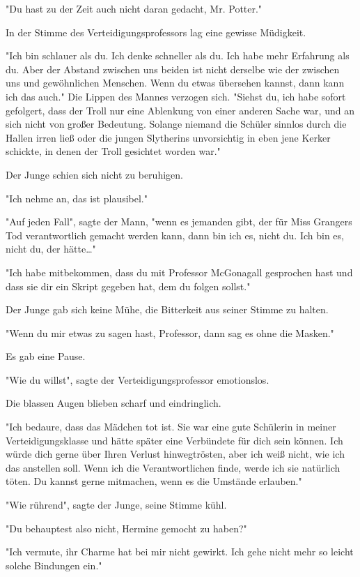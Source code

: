 {"Du hast zu der Zeit auch nicht daran gedacht, Mr. Potter."

In der Stimme des Verteidigungsprofessors lag eine gewisse Müdigkeit.

"Ich bin schlauer als du. Ich denke schneller als du. Ich habe mehr Erfahrung als du. Aber der Abstand zwischen uns beiden ist nicht derselbe wie der zwischen uns und gewöhnlichen Menschen. Wenn du etwas übersehen kannst, dann kann ich das auch." Die Lippen des Mannes verzogen sich. "Siehst du, ich habe sofort gefolgert, dass der Troll nur eine Ablenkung von einer anderen Sache war, und an sich nicht von großer Bedeutung. Solange niemand die Schüler sinnlos durch die Hallen irren ließ oder die jungen Slytherins unvorsichtig in eben jene Kerker schickte, in denen der Troll gesichtet worden war."

Der Junge schien sich nicht zu beruhigen.

"Ich nehme an, das ist plausibel."

"Auf jeden Fall", sagte der Mann, "wenn es jemanden gibt, der für Miss Grangers Tod verantwortlich gemacht werden kann, dann bin ich es, nicht du. Ich bin es, nicht du, der hätte…"

"Ich habe mitbekommen, dass du mit Professor McGonagall gesprochen hast und dass sie dir ein Skript gegeben hat, dem du folgen sollst."

Der Junge gab sich keine Mühe, die Bitterkeit aus seiner Stimme zu halten.

"Wenn du mir etwas zu sagen hast, Professor, dann sag es ohne die Masken."

Es gab eine Pause.

"Wie du willst", sagte der Verteidigungsprofessor emotionslos.

Die blassen Augen blieben scharf und eindringlich.

"Ich bedaure, dass das Mädchen tot ist. Sie war eine gute Schülerin in meiner Verteidigungsklasse und hätte später eine Verbündete für dich sein können. Ich würde dich gerne über Ihren Verlust hinwegtrösten, aber ich weiß nicht, wie ich das anstellen soll. Wenn ich die Verantwortlichen finde, werde ich sie natürlich töten. Du kannst gerne mitmachen, wenn es die Umstände erlauben."

"Wie rührend", sagte der Junge, seine Stimme kühl.

"Du behauptest also nicht, Hermine gemocht zu haben?"

"Ich vermute, ihr Charme hat bei mir nicht gewirkt. Ich gehe nicht mehr so leicht solche Bindungen ein."

}
